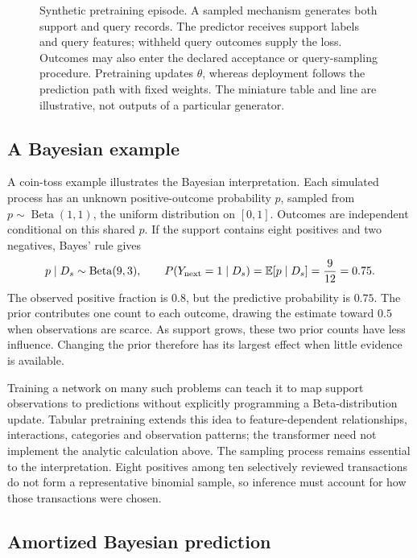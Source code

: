 \documentclass[11pt]{article}
\newcommand{\E}{\mathbb{E}}
\begin{document}
\begin{figure}[htbp]
\begin{tikzpicture}
\end{tikzpicture}
\caption{Synthetic pretraining episode. A sampled mechanism generates both support and query records. The predictor receives support labels and query features; withheld query outcomes supply the loss. Outcomes may also enter the declared acceptance or query-sampling procedure. Pretraining updates $\theta$, whereas deployment follows the prediction path with fixed weights. The miniature table and line are illustrative, not outputs of a particular generator.}
\label{fig:episode-generation}
\end{figure}

\subsection{A Bayesian example}

A coin-toss example illustrates the Bayesian interpretation. Each simulated process has an unknown positive-outcome probability $p$, sampled from $p\sim\operatorname{Beta}(1,1)$, the uniform distribution on $[0,1]$. Outcomes are independent conditional on this shared $p$. If the support contains eight positives and two negatives, Bayes' rule gives
\[
 p\mid D_s\sim\operatorname{Beta}(9,3),
 \qquad P(Y_{\rm next}=1\mid D_s)=\E[p\mid D_s]=\frac{9}{12}=0.75.
\]
The observed positive fraction is $0.8$, but the predictive probability is $0.75$. The prior contributes one count to each outcome, drawing the estimate toward $0.5$ when observations are scarce. As support grows, these two prior counts have less influence. Changing the prior therefore has its largest effect when little evidence is available.

Training a network on many such problems can teach it to map support observations to predictions without explicitly programming a Beta-distribution update. Tabular pretraining extends this idea to feature-dependent relationships, interactions, categories and observation patterns; the transformer need not implement the analytic calculation above. The sampling process remains essential to the interpretation. Eight positives among ten selectively reviewed transactions do not form a representative binomial sample, so inference must account for how those transactions were chosen.

\subsection{Amortized Bayesian prediction}
\end{document}

